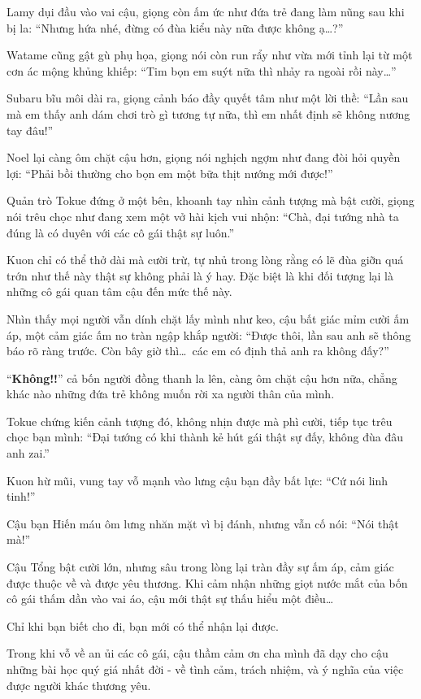 \documentclass[../main.tex]{subfiles}
\begin{document}
Lamy dụi đầu vào vai cậu, giọng còn ấm ức như đứa trẻ đang làm nũng sau khi bị la: ``Nhưng hứa nhé, đừng có đùa kiểu này nữa được không ạ\dots?''

Watame cũng gật gù phụ họa, giọng nói còn run rẩy như vừa mới tỉnh lại từ một cơn ác mộng khủng khiếp: ``Tim bọn em suýt nữa thì nhảy ra ngoài rồi này\dots''

Subaru bĩu môi dài ra, giọng cảnh báo đầy quyết tâm như một lời thề: ``Lần sau mà em thấy anh dám chơi trò gì tương tự nữa, thì em nhất định sẽ không nương tay đâu!''

Noel lại càng ôm chặt cậu hơn, giọng nói nghịch ngợm như đang đòi hỏi quyền lợi: ``Phải bồi thường cho bọn em một bữa thịt nướng mới được!''

Quản trò Tokue đứng ở một bên, khoanh tay nhìn cảnh tượng mà bật cười, giọng nói trêu chọc như đang xem một vở hài kịch vui nhộn: ``Chà, đại tướng nhà ta đúng là có duyên với các cô gái thật sự luôn.''

Kuon chỉ có thể thở dài mà cười trừ, tự nhủ trong lòng rằng có lẽ đùa giỡn quá trớn như thế này thật sự không phải là ý hay. Đặc biệt là khi đối tượng lại là những cô gái quan tâm cậu đến mức thế này.

Nhìn thấy mọi người vẫn dính chặt lấy mình như keo, cậu bất giác mỉm cười ấm áp, một cảm giác ấm no tràn ngập khắp người: ``Được thôi, lần sau anh sẽ thông báo rõ ràng trước. Còn bây giờ thì\dots\ các em có định thả anh ra không đấy?''

``\textbf{Không!!}'' cả bốn người đồng thanh la lên, càng ôm chặt cậu hơn nữa, chẳng khác nào những đứa trẻ không muốn rời xa người thân của mình.

Tokue chứng kiến cảnh tượng đó, không nhịn được mà phì cười, tiếp tục trêu chọc bạn mình: ``Đại tướng có khi thành kẻ hút gái thật sự đấy, không đùa đâu anh zai.''

Kuon hừ mũi, vung tay vỗ mạnh vào lưng cậu bạn đầy bất lực: ``Cứ nói linh tinh!''

Cậu bạn Hiến máu ôm lưng nhăn mặt vì bị đánh, nhưng vẫn cố nói: ``Nói thật mà!''

Cậu Tổng bật cười lớn, nhưng sâu trong lòng lại tràn đầy sự ấm áp, cảm giác được thuộc về và được yêu thương. Khi cảm nhận những giọt nước mắt của bốn cô gái thấm dần vào vai áo, cậu mới thật sự thấu hiểu một điều\dots

Chỉ khi bạn biết cho đi, bạn mới có thể nhận lại được.

Trong khi vỗ về an ủi các cô gái, cậu thầm cảm ơn cha mình đã dạy cho cậu những bài học quý giá nhất đời - về tình cảm, trách nhiệm, và ý nghĩa của việc được người khác thương yêu.
\end{document}
